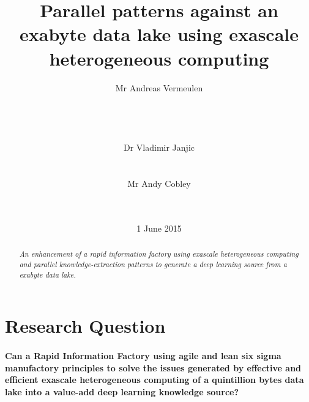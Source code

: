 \documentclass{acm_proc_article-sp}
\begin{document}
\title{Parallel patterns against an exabyte data lake using exascale heterogeneous computing}
\subtitle{}
\author{
\alignauthor
Mr Andreas Vermeulen\\
\\
\\
\\
\\
\alignauthor
Dr Vladimir Janjic\\
\\
\\
\alignauthor
Mr Andy Cobley\\
\\
\\
}
\date{1 June 2015}
\maketitle
\begin{abstract}
\textit{An enhancement of a rapid information factory using exascale heterogeneous computing and parallel knowledge-extraction patterns to generate a deep learning source from a exabyte data lake.}
\end{abstract}
\section{Research Question}
\paragraph{Can a Rapid Information Factory using agile and lean six sigma manufactory principles to solve the issues generated by effective and efficient exascale heterogeneous computing of a quintillion bytes data lake into a value-add deep learning knowledge source?}
\pagebreak
\end{document}
